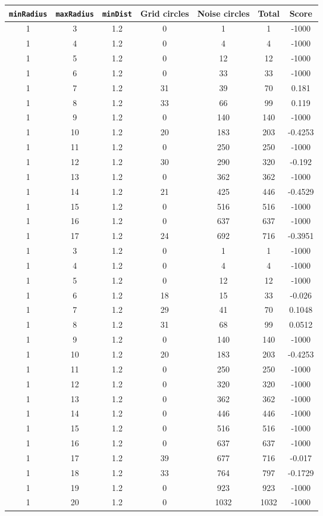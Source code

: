 \documentclass[letterpaper, 12pt]{article}
\begin{document}
\begin{longtable}{|c|c|c|c|c|c|c|}
\hline
\textbf{\texttt{minRadius}} & \textbf{\texttt{maxRadius}} & \textbf{\texttt{minDist}} & \textbf{Grid circles} & \textbf{Noise circles} & \textbf{Total} & \textbf{Score} \\
\hline
1 & 3 & 1.2 & 0 & 1 & 1 & -1000 \\
\hline
1 & 4 & 1.2 & 0 & 4 & 4 & -1000 \\
\hline
1 & 5 & 1.2 & 0 & 12 & 12 & -1000 \\
\hline
1 & 6 & 1.2 & 0 & 33 & 33 & -1000 \\
\hline
1 & 7 & 1.2 & 31 & 39 & 70 & 0.181 \\
\hline
1 & 8 & 1.2 & 33 & 66 & 99 & 0.119 \\
\hline
1 & 9 & 1.2 & 0 & 140 & 140 & -1000 \\
\hline
1 & 10 & 1.2 & 20 & 183 & 203 & -0.4253 \\
\hline
1 & 11 & 1.2 & 0 & 250 & 250 & -1000 \\
\hline
1 & 12 & 1.2 & 30 & 290 & 320 & -0.192 \\
\hline
1 & 13 & 1.2 & 0 & 362 & 362 & -1000 \\
\hline
1 & 14 & 1.2 & 21 & 425 & 446 & -0.4529 \\
\hline
1 & 15 & 1.2 & 0 & 516 & 516 & -1000 \\
\hline
1 & 16 & 1.2 & 0 & 637 & 637 & -1000 \\
\hline
1 & 17 & 1.2 & 24 & 692 & 716 & -0.3951 \\
\hline
1 & 3 & 1.2 & 0 & 1 & 1 & -1000 \\
\hline
1 & 4 & 1.2 & 0 & 4 & 4 & -1000 \\
\hline
1 & 5 & 1.2 & 0 & 12 & 12 & -1000 \\
\hline
1 & 6 & 1.2 & 18 & 15 & 33 & -0.026 \\
\hline
1 & 7 & 1.2 & 29 & 41 & 70 & 0.1048 \\
\hline
1 & 8 & 1.2 & 31 & 68 & 99 & 0.0512 \\
\hline
1 & 9 & 1.2 & 0 & 140 & 140 & -1000 \\
\hline
1 & 10 & 1.2 & 20 & 183 & 203 & -0.4253 \\
\hline
1 & 11 & 1.2 & 0 & 250 & 250 & -1000 \\
\hline
1 & 12 & 1.2 & 0 & 320 & 320 & -1000 \\
\hline
1 & 13 & 1.2 & 0 & 362 & 362 & -1000 \\
\hline
1 & 14 & 1.2 & 0 & 446 & 446 & -1000 \\
\hline
1 & 15 & 1.2 & 0 & 516 & 516 & -1000 \\
\hline
1 & 16 & 1.2 & 0 & 637 & 637 & -1000 \\
\hline
1 & 17 & 1.2 & 39 & 677 & 716 & -0.017 \\
\hline
1 & 18 & 1.2 & 33 & 764 & 797 & -0.1729 \\
\hline
1 & 19 & 1.2 & 0 & 923 & 923 & -1000 \\
\hline
1 & 20 & 1.2 & 0 & 1032 & 1032 & -1000 \\
\hline
\end{longtable}
\end{document}
